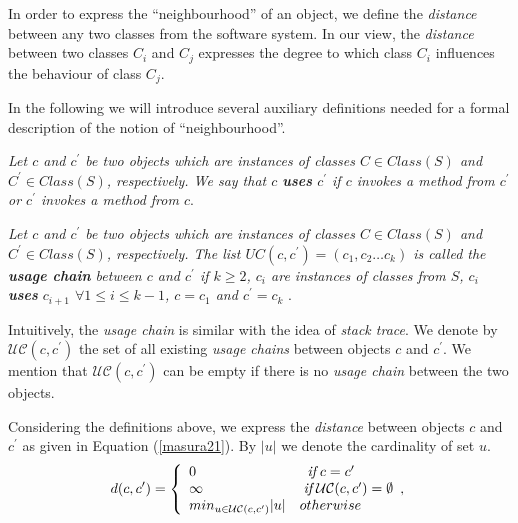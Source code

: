 In order to express the ``neighbourhood'' of an object, we define the \emph{distance} between any two classes from the software system. In our view, the \emph{distance} between two classes $C_i$ and $C_j$ expresses the degree to which class $C_i$ influences the behaviour of class $C_j$. 

In the following we will introduce several auxiliary definitions needed for a formal description of the notion of ``neighbourhood''.

\vspace{0.4cm}

\noindent
\begin{definition}\label{def_use}
{\it Let $c$ and $c^\prime$ be two objects which are instances of classes $C \in Class(S)$ and $C^\prime \in Class(S)$, respectively. We say that $c$ {\bf uses} $c^\prime$ if $c$ invokes a method from $c^\prime$ or $c^\prime$ invokes a method from $c$}.
\end{definition}


\noindent
\begin{definition}\label{def_usage}
{\it Let $c$ and $c^\prime$ be two objects which are instances of classes $C \in Class(S)$ and $C^\prime \in Class(S)$, respectively. The list $UC(c, c^\prime)=(c_1, c_2 \dots c_k)$ is called the {\bf usage chain} between $c$ and $c^\prime$ if $k \geq 2$, $c_i$ are instances of classes from $S$, $c_i$ {\bf uses} $c_{i+1}$ $\forall 1 \leq i \leq k-1$, $c=c_1$ and $c^\prime = c_k$ }.
\end{definition}

Intuitively, the \emph{usage chain} is similar with the idea of \emph{stack trace}. We denote by $\mathcal{UC}(c, c^\prime)$ the set of all existing \emph{usage chains} between objects $c$ and $c^\prime$. We mention that $\mathcal{UC}(c, c^\prime)$ can be empty if there is no \emph{usage chain} between the two objects. 

Considering the definitions above, we express the \emph{distance} between objects $c$ and $c^\prime$ as given in Equation (\ref{masura21}). By $|u|$ we denote the cardinality of set $u$.
\noindent
\begin{equation}\label{masura21}
d(c, c^\prime)=\left \{ \begin{array}{ll}
 0 & \;\;\emph{if} \; c=c^\prime\\
 \infty & \;\emph{if} \; \mathcal{UC}(c, c^\prime)=\emptyset\\
 min_{u \in \mathcal{UC}(c, c^\prime)}|u| & otherwise\\
 \end{array}, \right.
\end{equation}

